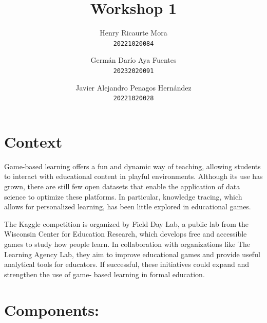 \documentclass{article}
\title{Workshop 1}
\author{
  Henry Ricaurte Mora \\ \texttt{20221020084} \and
  Germán Darío Aya Fuentes \\ \texttt{20232020091} \and
  Javier Alejandro Penagos Hernández \\ \texttt{20221020028}
}
\date{}
\begin{document}
\maketitle


\section*{Context}

Game-based learning offers a fun and dynamic way of teaching, allowing
students to interact with educational content in playful environments.
Although its use has grown, there are still few open datasets that enable 
the application of data science to optimize these platforms. In 
particular, knowledge tracing, which allows for personalized learning, has
been little explored in educational games. 

The Kaggle competition is organized by Field Day Lab, a public lab from
the Wisconsin Center for Education Research, which develops free and 
accessible games to study how people learn. In collaboration with 
organizations like The Learning Agency Lab, they aim to improve 
educational games and provide useful analytical tools for educators. If 
successful, these initiatives could expand and strengthen the use of game-
based learning in formal education.

\section*{Components: }
\end{document}
